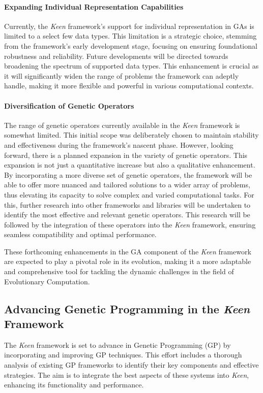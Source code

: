        \paragraph{Expanding Individual Representation Capabilities}
            Currently, the \textit{Keen} framework's support for individual representation in GAs is limited to a select 
            few data types. This limitation is a strategic choice, stemming from the framework's early development 
            stage, focusing on ensuring foundational robustness and reliability. Future developments will be directed 
            towards broadening the spectrum of supported data types. This enhancement is crucial as it will 
            significantly widen the range of problems the framework can adeptly handle, making it more flexible and 
            powerful in various computational contexts.

        \paragraph{Diversification of Genetic Operators}
            The range of genetic operators currently available in the \textit{Keen} framework is somewhat limited. This 
            initial scope was deliberately chosen to maintain stability and effectiveness during the framework's nascent 
            phase. However, looking forward, there is a planned expansion in the variety of genetic operators. This 
            expansion is not just a quantitative increase but also a qualitative enhancement. By incorporating a more 
            diverse set of genetic operators, the framework will be able to offer more nuanced and tailored solutions to 
            a wider array of problems, thus elevating its capacity to solve complex and varied computational tasks.
            For this, further research into other frameworks and libraries will be undertaken to identify the most 
            effective and relevant genetic operators. This research will be followed by the integration of these 
            operators into the \textit{Keen} framework, ensuring seamless compatibility and optimal performance.

        These forthcoming enhancements in the GA component of the \textit{Keen} framework are expected to play a pivotal 
        role in its evolution, making it a more adaptable and comprehensive tool for tackling the dynamic challenges in 
        the field of Evolutionary Computation.

        \subsection{Advancing Genetic Programming in the \textit{Keen} Framework}
        \label{sec:future:gp}
            The \textit{Keen} framework is set to advance in Genetic Programming (GP) by incorporating and improving GP
            techniques. This effort includes a thorough analysis of existing GP frameworks to identify their key 
            components and effective strategies. The aim is to integrate the best aspects of these systems into 
            \textit{Keen}, enhancing its functionality and performance.
        
